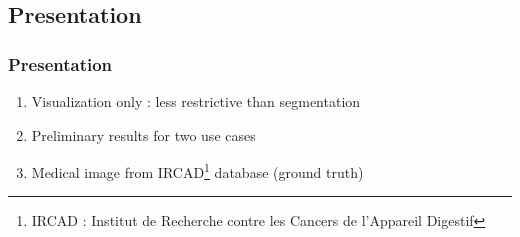 	\subsection[Presentation]{Presentation}
		\begin{frame}
			\frametitle{Presentation}
				\begin{enumerate}
					\item Visualization only : less restrictive than segmentation
					\item Preliminary results for two use cases
					\item Medical image  from IRCAD\footnote{IRCAD : Institut de Recherche contre les Cancers de l'Appareil Digestif} database (ground truth)
				\end{enumerate}				
				\begin{center}
					\vspace{1em}				
				\end{center}
		\end{frame}
		
		
